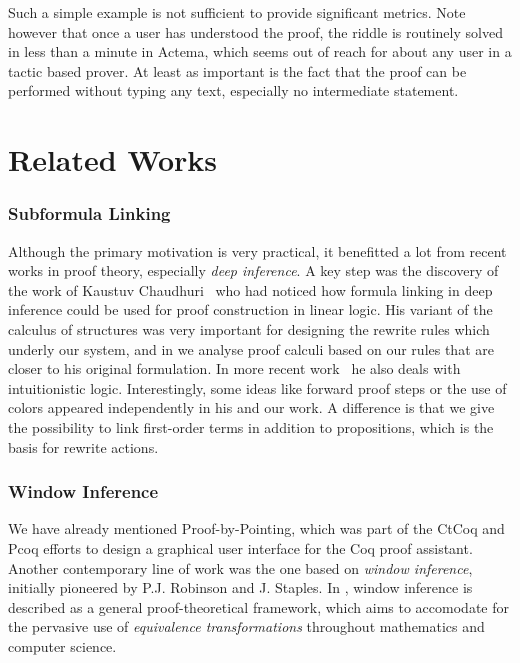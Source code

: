 Such a simple example is not sufficient to provide significant
metrics. Note however that once a user has understood the proof, the
riddle is routinely solved in less than a minute in Actema, which
seems out of reach for about any user in a tactic based prover. At
least as important is the fact that the proof can be performed without
typing any text, especially no intermediate statement. 

\section{Related Works}

\subsubsection*{Subformula Linking}
Although the primary motivation is very practical, it benefitted a lot from
recent works in proof theory, especially \emph{deep inference}. A key step was
the discovery of the work of Kaustuv Chaudhuri~\cite{Chaudhuri2013} who had
noticed how formula linking in deep inference could be used for proof
construction in linear logic. His variant of the calculus of structures was very
important for designing the rewrite rules which underly our system, and in
 we analyse proof calculi based on our rules that are closer to his
original formulation. In more recent work~\cite{DBLP:conf/cade/Chaudhuri21} he
also deals with intuitionistic logic. Interestingly, some ideas like forward
proof steps or the use of colors appeared independently in his and our work. A
difference is that we give the possibility to link first-order terms in addition
to propositions, which is the basis for rewrite actions.



\subsubsection*{Window Inference}
We have already mentioned Proof-by-Pointing, which was part of the CtCoq and
Pcoq efforts \cite{amerkad-mathematics-2001} to design a graphical user
interface for the Coq proof assistant. Another contemporary line of work was the
one based on \emph{window inference}, initially pioneered by P.J. Robinson and
J. Staples. In \cite{robinson-formalizing-1993}, window inference is described
as a general proof-theoretical framework, which aims to accomodate for the
pervasive use of \emph{equivalence transformations} throughout mathematics and
computer science.

